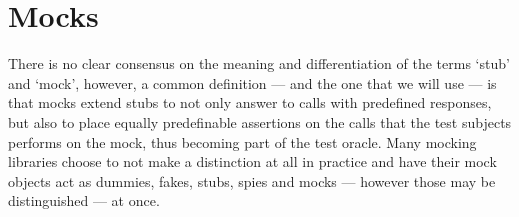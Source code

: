 \section{Mocks}
There is no clear consensus on the meaning and differentiation
of the terms `stub' and `mock', however, a common definition
--- and the one that we will use ---
is that mocks extend stubs to
not only answer to calls with predefined responses,
but also to place equally predefinable assertions on
the calls that the test subjects performs on the mock,
\autocite{MocksArentStubs}
thus becoming part of the test oracle.
Many mocking libraries choose to
not make a distinction at all in practice
and have their mock objects act as
dummies, fakes, stubs, spies and mocks
--- however those may be distinguished --- at once.
\autocite{SpockFrameworkDoc}\autocite{JestMockFunctions}
